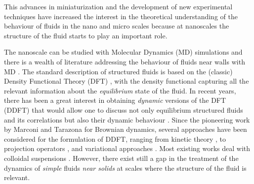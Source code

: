 \documentclass[b5paper,openright,10pt]{book}
\begin{document}
This   advances  in   miniaturization  and   the  development   of  new
experimental techniques have  increased the
interest in the  theoretical understanding of the  behaviour of fluids in the nano \cite{Bocquet2010,KarniadakisBook2005} and micro \cite{Lauga2005, Bocquet2011,KarniadakisBook2005} scales because at nanoscales  the structure  of the  fluid starts to play an  important
role.   

The
nanoscale can be studied with Molecular Dynamics (MD) simulations and there
is  a wealth  of literature  addressing the  behaviour of  fluids near
walls  with  MD \cite{Koplik1995,Wang2017}.   
The standard  description of structured fluids is  based on the
(classic) Density Functional Theory (DFT) \cite{Evans1979}, with the density
functional   capturing  all   the  relevant   information  about   the
\textit{equilibrium} state  of the fluid.   In recent years,  there has
been a  great interest in  obtaining \textit{dynamic} versions  of the
DFT (DDFT) that would allow one  to discuss not
only equilibrium structured fluids and its correlations but also their
dynamic  behaviour \cite{Lowen2003,Evans2016}.   Since the  pioneering
work by Marconi and Tarazona  \cite{Marconi2000} for Brownian dynamics, several approaches
have been considered  for the formulation of DDFT,
ranging from  kinetic theory  \cite{Guo2006}, to  projection operators
\cite{Espanol2009a},  and variational  approaches \cite{Schmidt2013}.
Most    existing    works     deal    with    colloidal    suspensions
\cite{Goddard2012,Evans2016}. However, there exist  still a gap in the
treatment  of the dynamics of \textit{simple}  fluids \textit{near  solids} at  scales
where  the  structure  of  the  fluid  is  relevant.   
\end{document}

